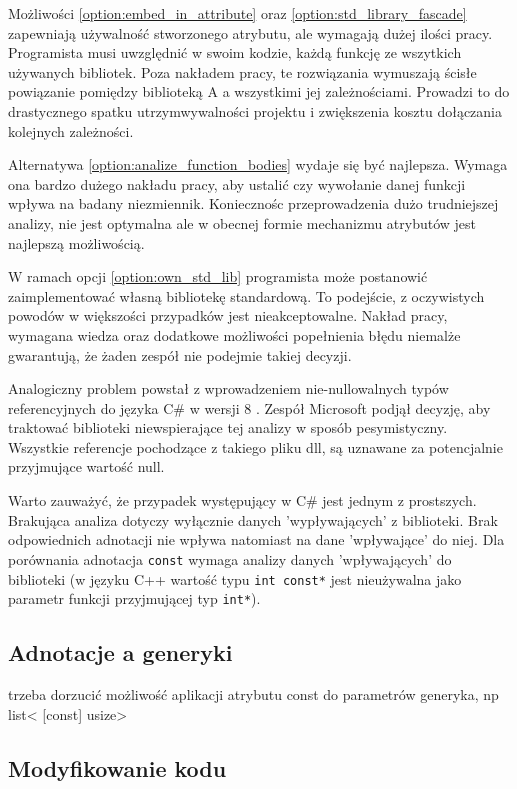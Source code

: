 Możliwości \ref{option:embed_in_attribute} oraz \ref{option:std_library_fascade} zapewniają używalność stworzonego atrybutu, ale wymagają dużej ilości pracy.
Programista musi uwzględnić w swoim kodzie, każdą funkcję ze wszytkich używanych bibliotek.
Poza nakładem pracy, te rozwiązania wymuszają ścisłe powiązanie pomiędzy biblioteką A a wszystkimi jej zależnościami.
Prowadzi to do drastycznego spatku utrzymwywalności projektu i zwiększenia kosztu dołączania kolejnych zależności.

Alternatywa \ref{option:analize_function_bodies} wydaje się być najlepsza. 
Wymaga ona bardzo dużego nakładu pracy, aby ustalić czy wywołanie danej funkcji wpływa na badany niezmiennik.
Koniecznośc przeprowadzenia dużo trudniejszej analizy, nie jest optymalna ale w obecnej formie mechanizmu atrybutów jest najlepszą możliwością.

W ramach opcji \ref{option:own_std_lib} programista może postanowić zaimplementować własną bibliotekę standardową.
To podejście, z oczywistych powodów w większości przypadków jest nieakceptowalne.
Nakład pracy, wymagana wiedza oraz dodatkowe możliwości popełnienia błędu niemalże gwarantują, że żaden zespół nie podejmie takiej decyzji.

Analogiczny problem powstał z wprowadzeniem nie-nullowalnych typów referencyjnych do języka C\# w wersji 8 \cite{wagner_2021, strauss2019new_cs_new_features}.
Zespół Microsoft podjął decyzję, aby traktować biblioteki niewspierające tej analizy w sposób pesymistyczny.
Wszystkie referencje pochodzące z takiego pliku dll, są uznawane za potencjalnie przyjmujące wartość null.

Warto zauważyć, że przypadek występujący w C\# jest jednym z prostszych.
Brakująca analiza dotyczy wyłącznie danych 'wypływających' z biblioteki.
Brak odpowiednich adnotacji nie wpływa natomiast na dane 'wpływające' do niej.
Dla porównania adnotacja \lstinline{const} wymaga analizy danych 'wpływających' do biblioteki (w języku C++ wartość typu \lstinline{int const*} jest nieużywalna jako parametr funkcji przyjmującej typ \lstinline{int*}).

\subsection{Adnotacje a generyki}
\label{Generic_adnotations}
trzeba dorzucić możliwość aplikacji atrybutu const do parametrów generyka, np list< [const] usize>

\subsection{Modyfikowanie kodu}

